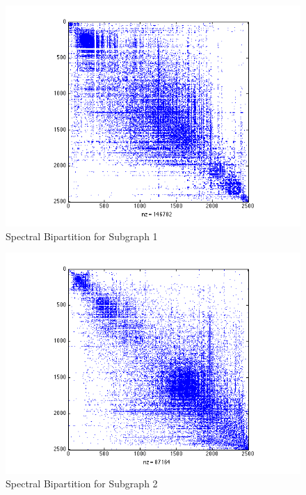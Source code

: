 \documentclass[11pt]{article}
\begin{document}
		 \begin{figure}[t]
		 		\begin{center}
		  		\includegraphics[width=1\linewidth]{spectral_partition_a1.png}
		  	\end{center}
		  	\vspace{-20pt}
		  	\caption{Spectral Bipartition for Subgraph 1}
		  	\label{fig:sb1}
		 \end{figure}
		 
		 \begin{figure}[t]
		 		\begin{center}
		  		\includegraphics[width=1\linewidth]{spectral_partition_a2.png}
		  	\end{center}
		  	\vspace{-20pt}
		  	\caption{Spectral Bipartition for Subgraph 2}
		  	\label{fig:sb2}
		 \end{figure}
		 
\end{document}
